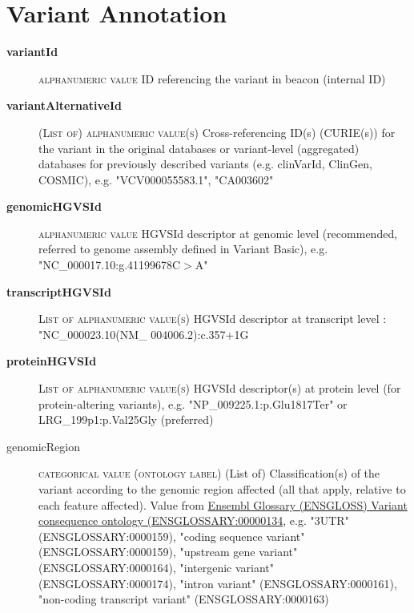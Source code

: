 \documentclass[a4paper, 10pt]{article}        %
\begin{document}
 
  \section*{ {\color{teal} Variant Annotation}}
  
  \begin{description}
	\item[\textbf{variantId}] {\textsc{alphanumeric value}} ID referencing the variant in beacon (internal ID)
	\item[\textbf{variantAlternativeId}] {\textsc{(List of) alphanumeric value(s)}} Cross-referencing ID(s) (CURIE(s)) for the variant in the original databases or variant-level (aggregated) databases for previously described variants (e.g. clinVarId, ClinGen, COSMIC), e.g. "VCV000055583.1", "CA003602"
	\item[\textbf{genomicHGVSId}]  {\textsc{alphanumeric value}} HGVSId descriptor at genomic level (recommended, referred to genome assembly defined in Variant Basic), e.g. "NC\_000017.10:g.41199678C$>$A"
	\item[\textbf{transcriptHGVSId}] {\textsc{List of alphanumeric value(s)}} HGVSId descriptor at transcript level : "NC\_000023.10(NM\_ 004006.2):c.357+1G%
	\item[\textbf{proteinHGVSId}] {\textsc{List of alphanumeric value(s)}} HGVSId descriptor(s) at protein level (for protein-altering variants), e.g. "NP\_009225.1:p.Glu1817Ter" or LRG\_199p1:p.Val25Gly (preferred)
	\item[genomicRegion] {\textsc{categorical value (ontology label)}} (List of) Classification(s) of the variant according to the genomic region affected (all that apply, relative to each feature affected). Value from \href{http://ensembl.org/glossary/ENSGLOSSARY_0000134}{Ensembl Glossary (ENSGLOSS) Variant consequence ontology (ENSGLOSSARY:00000134}, e.g. "3UTR" (ENSGLOSSARY:0000159), "coding sequence variant" (ENSGLOSSARY:0000159), "upstream gene variant" (ENSGLOSSARY:0000164), "intergenic variant" (ENSGLOSSARY:0000174), "intron variant" (ENSGLOSSARY:0000161), "non-coding transcript variant" (ENSGLOSSARY:0000163)


\end{description}
\end{document}
